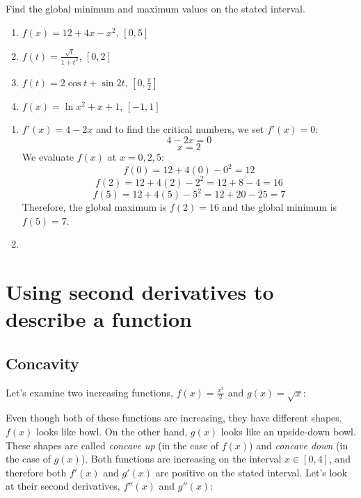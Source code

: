 \begin{Exercise}[label=gloext2]
Find the global minimum and maximum values on the stated interval.
\begin{enumerate}
\item $f(x) = 12+4x-x^2$, $[0,5]$
\item $f(t) = \frac{\sqrt{t}}{1+t^2}$, $[0, 2]$
\item $f(t) = 2\cos{t} + \sin{2t}$, $[0, \frac{\pi}{2}]$
\item $f(x) = \ln{x^2+x+1}$, $[-1, 1]$
\end{enumerate}
\end{Exercise}

\begin{Answer}[ref=gloext2]
\begin{enumerate}
\item $f'(x) = 4-2x$ and to find the critical numbers, we set $f'(x)=0$:
$$4-2x=0$$
$$x=2$$
We evaluate $f(x)$ at $x=0, 2, 5$:
$$f(0) = 12+4(0)-0^2=12$$
$$f(2) = 12+4(2)-2^2=12+8-4=16$$
$$f(5) = 12+4(5)-5^2=12+20-25=7$$
Therefore, the global maximum is $f(2) = 16$ and the global minimum is $f(5) = 7$.
\item %
\end{enumerate}
\end{Answer}

\section{Using second derivatives to describe a function}
\subsection{Concavity}
Let's examine two increasing functions, $f(x) = \frac{x^2}{2}$ and $g(x) = \sqrt{x}$:
\begin{figure}
\centering
{}
\end{figure}

Even though both of these functions are increasing, they have different shapes. $f(x)$ looks like bowl. On the other hand, $g(x)$ looks like an upside-down bowl. These shapes are called \textit{concave up} (in the case of $f(x)$) and \textit{concave down} (in the case of $g(x)$). Both functions are increasing on the interval $x \in [0, 4]$, and therefore both $f'(x)$ and $g'(x)$ are positive on the stated interval. Let's look at their second derivatives, $f''(x)$ and $g''(x)$:

